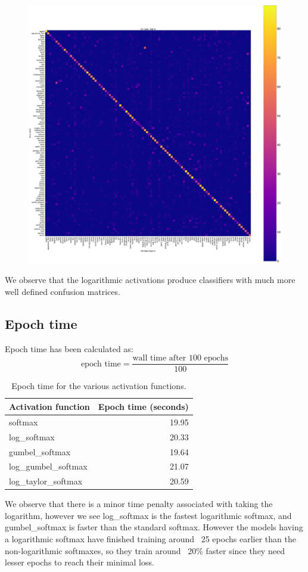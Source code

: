 \documentclass{article}
\begin{document}
\begin{figure}[h]
\centering
\begin{minipage}{.5\textwidth}
  \centering
  \includegraphics[width=.6\linewidth]{assets/log_taylor_softmax_cm.png}
  \newline
  \noindent
  \label{fig:test2}
\end{minipage}
\end{figure}

\noindent
We observe that the logarithmic activations produce classifiers with much more well defined confusion matrices.
\newpage
\subsection{Epoch time}
Epoch time has been calculated as:
\[ \text{epoch time} = \frac{\text{wall time after 100 epochs}}{100}\]
\newline

\begin{table}[h]
\centering
\begin{tabular}{l|r}
Activation function & Epoch time (seconds) \\\hline
softmax & 19.95\\
log\_softmax & 20.33 \\
gumbel\_softmax & 19.64 \\
log\_gumbel\_softmax & 21.07\\
log\_taylor\_softmax & 20.59 
\end{tabular}
\caption{\label{tab:widgets}Epoch time for the various activation functions.}
\end{table}
\noindent
We observe that there is a minor time penalty associated with taking the logarithm, however we see log\_softmax is the fastest logarithmic softmax, and gumbel\_softmax is faster than the standard softmax.
\newline
\noindent
However the models having a logarithmic softmax have finished training around ~25 epochs earlier than the non-logarithmic softmaxes, so they train around ~20\% faster since they need lesser epochs to reach their minimal loss.
\end{document}
